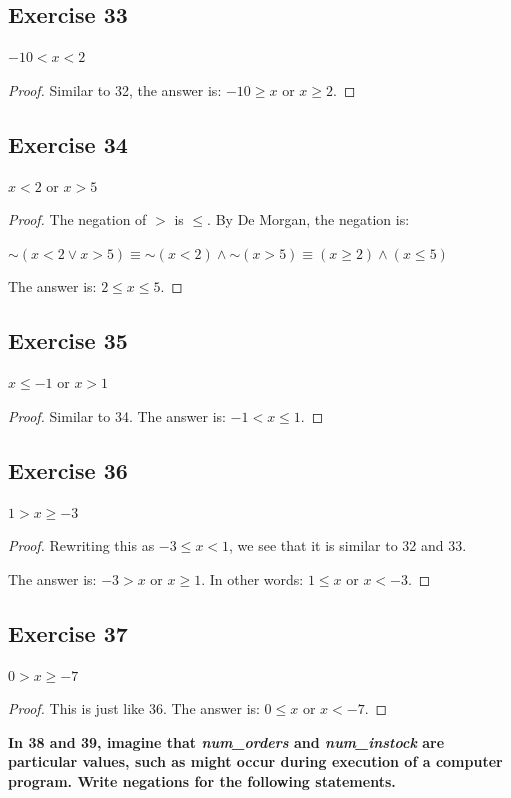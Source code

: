 \documentclass[14pt]{extarticle}
\begin{document}
\subsection{Exercise 33}
$-10 < x < 2$

\begin{proof}
Similar to 32, the answer is: $-10 \geq x$ or $x \geq 2$.
\end{proof}

\subsection{Exercise 34}
$x < 2$ or $x > 5$

\begin{proof}
The negation of $>$ is $\leq$. By De Morgan, the negation is:

${\sim(x < 2 \vee x > 5)} \equiv {\sim (x < 2)} \wedge {\sim (x > 5)} \equiv (x
\geq 2) \wedge (x \leq 5)$

The answer is: $2 \leq x \leq 5$.
\end{proof}

\subsection{Exercise 35}
$x \leq -1$ or $x > 1$

\begin{proof}
Similar to 34. The answer is: $-1 < x \leq 1$.
\end{proof}

\subsection{Exercise 36}
$1 > x \geq -3$

\begin{proof}
Rewriting this as $-3 \leq x < 1$, we see that it is similar to 32 and 33.

The answer is: $-3 > x$ or $x \geq 1$. In other words: $1 \leq x$ or $x < -3$.
\end{proof}

\subsection{Exercise 37}
$0 > x \geq -7$

\begin{proof}
This is just like 36. The answer is: $0 \leq x$ or $x < -7$.
\end{proof}

{\bf In 38 and 39, imagine that {\it num\_orders} and {\it num\_instock} are
particular values, such as might occur during execution of a computer program.
Write negations for the following statements.}
\end{document}
